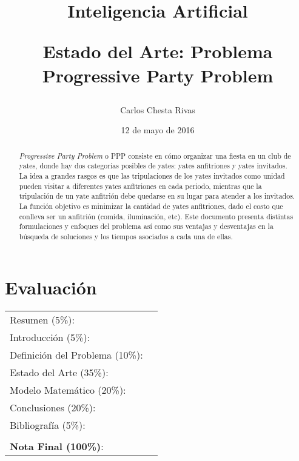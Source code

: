 \documentclass[letter, 10pt]{article}
\begin{document}
\title{Inteligencia Artificial \\ \begin{Large}Estado del Arte: Problema Progressive Party Problem\end{Large}}
\author{Carlos Chesta Rivas}
\date{12 de mayo de 2016}
\maketitle


\section*{Evaluación}

\begin{tabular}{ll}
Resumen (5\%): & \underline{\hspace{2cm}} \\
Introducción (5\%):  & \underline{\hspace{2cm}} \\
Definición del Problema (10\%):  & \underline{\hspace{2cm}} \\
Estado del Arte (35\%):  & \underline{\hspace{2cm}} \\
Modelo Matemático (20\%): &  \underline{\hspace{2cm}}\\
Conclusiones (20\%): &  \underline{\hspace{2cm}}\\
Bibliografía (5\%): & \underline{\hspace{2cm}}\\
 &  \\
\textbf{Nota Final (100\%)}:   & \underline{\hspace{2cm}}
\end{tabular}
\vspace{2cm}


\begin{abstract}

\textit{Progressive Party Problem} o PPP consiste en cómo organizar una fiesta en un club de yates, donde hay dos categorías posibles de yates: yates anfitriones y yates invitados. La idea a grandes rasgos es que las tripulaciones de los yates invitados como unidad pueden visitar a diferentes yates anfitriones en cada periodo, mientras que la tripulación de un yate anfitrión debe quedarse en su lugar para atender a los invitados. La función objetivo es minimizar la cantidad de yates anfitriones, dado el costo que conlleva ser un anfitrión (comida, iluminación, etc). Este documento presenta distintas formulaciones y enfoques del problema así como sus ventajas y desventajas en la búsqueda de soluciones y los tiempos asociados a cada una de ellas.
\end{abstract}
\end{document}
